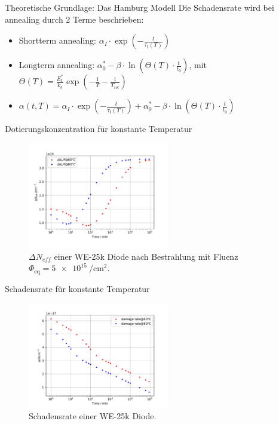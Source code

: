 \documentclass[aspectratio=1610, 9pt]{beamer}
\begin{document}
\begin{frame}{Theoretische Grundlage: Das Hamburg Modell}
  Die Schadensrate wird bei annealing durch 2 Terme beschrieben:
  \medskip
  \begin{itemize}
    \item Shortterm annealing:\: $\alpha_I \cdot \exp{\left(-\frac{t}{\tau_{\mathrm{I}}(T)}\right)}$
    \medskip
    \item Longterm annealing:\: $\alpha_{\mathrm{0}}^{*} -\beta \cdot \ln{\left(\Theta(T) \cdot \frac{t}{t_{\mathrm{0}}}\right)}$, \:\:\: mit \: $\Theta(T) = \frac{E_{\mathrm{I}}^*}{k_b} \exp{\left(-\frac{1}{T}-\frac{1}{T_{\mathrm{ref}}}\right)}$
    \medskip
    \item $\alpha(t, T) = \alpha_I \cdot \exp{\left(-\frac{t}{\tau_{\mathrm{I}}(T)}\right)} + \alpha_{\mathrm{0}}^{*} -\beta \cdot \ln{\left(\Theta(T) \cdot \frac{t}{t_{\mathrm{0}}}\right)}$
  \end{itemize}
  \medskip

\end{frame}

\begin{frame}{Dotierungskonzentration für konstante Temperatur}
  \begin{figure}
      \includegraphics[width=0.55\textwidth]{images/annealing.PDF}
  \caption{$\Delta N_{eff}$ einer WE-25k Diode nach Bestrahlung mit Fluenz $\Phi_{\mathrm{eq}} = \SI{5e15}{\per\centi\meter\squared}.$}
  \end{figure}
\end{frame}

\begin{frame}{Schadensrate für konstante Temperatur}
  \begin{figure}
      \includegraphics[width=0.55\textwidth]{images/damage.PDF}
  \caption{Schadensrate einer WE-25k Diode.}
  \end{figure}
\end{frame}
\end{document}
